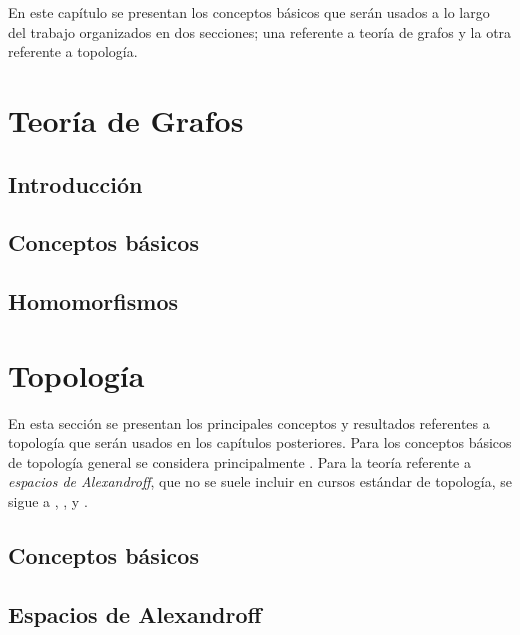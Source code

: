 En este capítulo se presentan los conceptos básicos que serán usados a lo largo del trabajo organizados en dos secciones; una referente a teoría de grafos y la otra referente a topología.
\section{Teoría de Grafos}
\subsection{Introducción}

\subsection{Conceptos básicos}

\subsection{Homomorfismos}

\section{Topología}
En esta sección se presentan los principales conceptos y resultados referentes a topología que serán usados en los capítulos posteriores. Para los conceptos básicos de topología general se considera principalmente \cite{munkres2000}. Para la teoría referente a \textit{espacios de Alexandroff}, que no se suele incluir en cursos estándar de topología, se sigue a \cite{alexandroff1937}, \cite{arenas1999}, \cite{mesa2019} y \cite{speer2007}.
\subsection{Conceptos básicos}\label{subsec:topologia_general}

\subsection{Espacios de Alexandroff}\label{subsec:Alexandroff}

